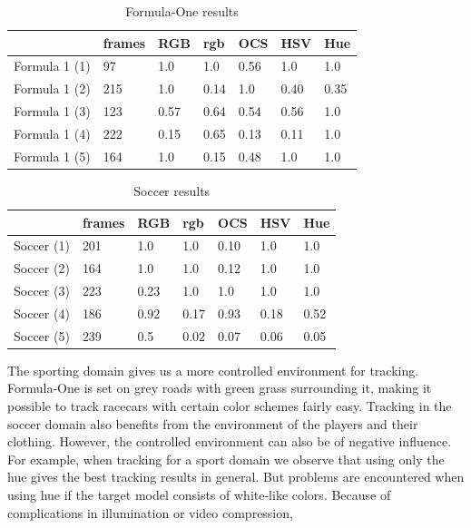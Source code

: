 \documentclass[a4paper,11pt]{article}
\begin{document}
		\begin{table}[H]
			\centering
			\begin{tabular}{| l | l | l | l | l | l | l |}
			\hline
			              & frames & RGB & rgb & OCS & HSV & Hue \\
			\hline
			Formula 1 (1) &  97    & 1.0   & 1.0  & 0.56 & 1.0  & 1.0  \\
			Formula 1 (2) & 215    & 1.0   & 0.14 & 1.0  & 0.40 & 0.35 \\
			Formula 1 (3) & 123    & 0.57  & 0.64 & 0.54 & 0.56 & 1.0  \\
			Formula 1 (4) & 222    & 0.15  & 0.65 & 0.13 & 0.11 & 1.0  \\
			Formula 1 (5) & 164    & 1.0   & 0.15 & 0.48 & 1.0  & 1.0  \\
			\hline
			\end{tabular}
			\caption{Formula-One results}
			\label{table:f1}
		\end{table}
		\begin{table}[H]
			\centering
			\begin{tabular}{| l | l | l | l | l | l | l |}
			\hline
			          & frames & RGB & rgb & OCS & HSV & Hue \\
			\hline
			Soccer (1)& 201    & 1.0  & 1.0  & 0.10 & 1.0  & 1.0  \\
			Soccer (2)& 164    & 1.0  & 1.0  & 0.12 & 1.0  & 1.0  \\
			Soccer (3)& 223    & 0.23 & 1.0  & 1.0  & 1.0  & 1.0  \\
			Soccer (4)& 186    & 0.92 & 0.17 & 0.93 & 0.18 & 0.52 \\
			Soccer (5)& 239    & 0.5  & 0.02 & 0.07 & 0.06 & 0.05 \\
			\hline
			\end{tabular}
			\caption{Soccer results}
			\label{table:soc}
		\end{table}
		\noindent
		The sporting domain gives us a more controlled environment for tracking. Formula-One is set on
		grey roads with green grass surrounding it, making it possible to track racecars with certain
		color schemes fairly easy. Tracking in the soccer domain also benefits from the environment of
		the players and their clothing. However, the controlled environment can also be of negative
		influence. For example, when tracking for a sport domain we observe that using only the hue gives
		the best tracking results in general. But problems are encountered when using hue if the target
		model consists of white-like colors. Because of complications in illumination or video compression,
\end{document}
